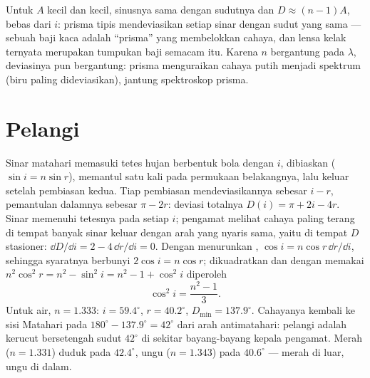 \begin{remark}\label{rem:b1:rays-reflection-refraction:thin}
Untuk $A$ kecil dan  kecil, sinusnya sama dengan sudutnya
dan $D \approx (n - 1)A$, bebas dari $i$: prisma tipis mendeviasikan
setiap sinar dengan sudut yang sama --- sebuah baji kaca adalah
``prisma'' yang membelokkan cahaya, dan lensa kelak ternyata merupakan
tumpukan baji semacam itu. Karena $n$ bergantung pada $\lambda$,
deviasinya pun bergantung: prisma menguraikan cahaya putih menjadi
spektrum (biru paling dideviasikan), jantung spektroskop prisma.
\end{remark}

\section{Pelangi}

\begin{example}\label{ex:b1:rays-reflection-refraction:rainbow}
Sinar matahari memasuki tetes hujan berbentuk bola dengan 
$i$, dibiaskan ($\sin i = n\sin r$), memantul satu kali pada permukaan
belakangnya, lalu keluar setelah pembiasan kedua. Tiap pembiasan
mendeviasikannya sebesar $i - r$, pemantulan dalamnya sebesar
$\pi - 2r$: deviasi totalnya $D(i) = \pi + 2i - 4r$. Sinar memenuhi
tetesnya pada setiap $i$; pengamat melihat cahaya paling terang di
tempat banyak sinar keluar dengan arah yang nyaris sama, yaitu di tempat
$D$ stasioner: $\dd D/\dd i = 2 - 4\,\dd r/\dd i
= 0$. Dengan menurunkan , $\cos i = n\cos r\,\dd r/\dd i$,
sehingga syaratnya berbunyi $2\cos i = n\cos r$; dikuadratkan dan dengan
memakai $n^2\cos^2 r = n^2 - \sin^2 i = n^2 - 1 + \cos^2 i$ diperoleh
\[
\cos^2 i = \frac{n^2 - 1}{3} .
\]
Untuk air, $n = 1.333$: $i = 59.4^\circ$, $r = 40.2^\circ$,
$D_{\min} = 137.9^\circ$. Cahayanya kembali ke sisi Matahari
pada $180^\circ - 137.9^\circ = 42^\circ$ dari arah antimatahari:
pelangi adalah kerucut bersetengah sudut $42^\circ$ di sekitar bayang-bayang
kepala pengamat. Merah ($n = 1.331$) duduk pada $42.4^\circ$, ungu
($n = 1.343$) pada $40.6^\circ$ --- merah di luar, ungu di dalam.
\end{example}

